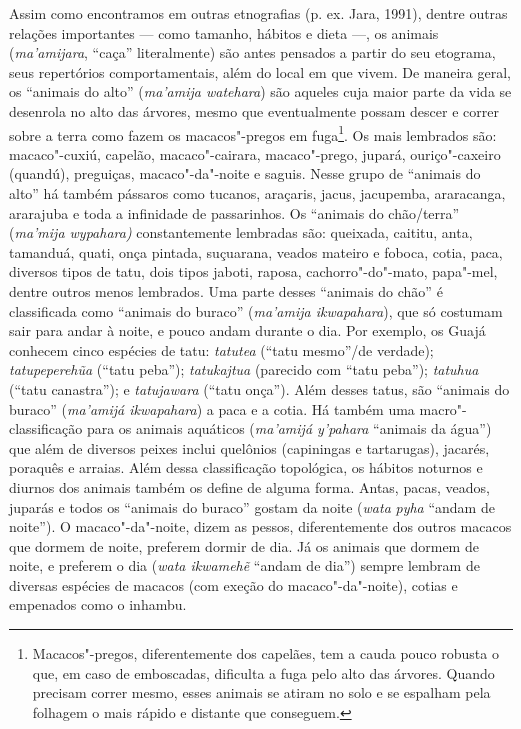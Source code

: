 Assim como encontramos em outras etnografias (p. ex. Jara, 1991), dentre
outras relações importantes --- como tamanho, hábitos e dieta ---, os
animais (\emph{ma'amijara}, ``caça'' literalmente) são antes pensados a partir do seu etograma, seus repertórios comportamentais, além do local em que vivem. De maneira geral, os ``animais do alto''
(\emph{ma'amija watehara}) são aqueles cuja maior parte da vida se
desenrola no alto das árvores, mesmo que eventualmente possam descer e
correr sobre a terra como fazem os macacos"-pregos em fuga\footnote{Macacos"-pregos,
  diferentemente dos capelães, tem a cauda pouco robusta o que, em caso
  de emboscadas, dificulta a fuga pelo alto das árvores. Quando precisam
  correr mesmo, esses animais se atiram no solo e se espalham pela
  folhagem o mais rápido e distante que conseguem.}. Os mais lembrados
são: macaco"-cuxiú, capelão, macaco"-cairara, macaco"-prego, jupará,
ouriço"-caxeiro (quandú), preguiças, macaco"-da"-noite e saguis. Nesse
grupo de ``animais do alto'' há também pássaros como tucanos, araçaris,
jacus, jacupemba, araracanga, ararajuba e toda a infinidade de
passarinhos. Os ``animais do chão/terra'' (\emph{ma'mija wypahara)}
constantemente lembradas são: queixada, caititu, anta, tamanduá, quati,
onça pintada, suçuarana, veados mateiro e foboca, cotia, paca, diversos
tipos de tatu, dois tipos jaboti, raposa, cachorro"-do"-mato, papa"-mel,
dentre outros menos lembrados. Uma parte desses ``animais do chão'' é
classificada como ``animais do buraco'' (\emph{ma'amija ikwapahara}),
que só costumam sair para andar à noite, e pouco andam durante o dia.
Por exemplo, os Guajá conhecem cinco espécies de tatu: \emph{tatutea}
(``tatu mesmo''/de verdade); \emph{tatupeperehũa} (``tatu peba'');
\emph{tatukajtua} (parecido com ``tatu peba''); \emph{tatuhua} (``tatu
canastra''); e \emph{tatujawara} (``tatu onça''). Além desses tatus, são
``animais do buraco'' (\emph{ma'amijá ikwapahara}) a paca e a cotia. Há
também uma macro"-classificação para os animais aquáticos (\emph{ma'amijá
y'pahara} ``animais da água'') que além de diversos peixes inclui
quelônios (capiningas e tartarugas), jacarés, poraquês e arraias. Além
dessa classificação topológica, os hábitos noturnos e diurnos dos
animais também os define de alguma forma. Antas, pacas, veados, juparás
e todos os ``animais do buraco'' gostam da noite (\emph{wata}
\emph{pyha} ``andam de noite''). O macaco"-da"-noite, dizem as pessos,
diferentemente dos outros macacos que dormem de noite, preferem dormir
de dia. Já os animais que dormem de noite, e preferem o dia (\emph{wata
ikwamehẽ} ``andam de dia'') sempre lembram de diversas espécies de
macacos (com exeção do macaco"-da"-noite), cotias e empenados como o
inhambu.

